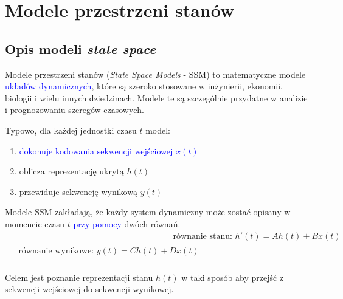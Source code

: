 \documentclass[data-science]{agh-wi} %
\begin{document}

\section{Modele przestrzeni stanów}
\subsection{Opis modeli \textit{state space}}
Modele przestrzeni stanów (\textit{State Space Models} - SSM) to matematyczne modele \textcolor{blue}{układów dynamicznych}, które są szeroko stosowane w inżynierii, ekonomii, biologii i wielu innych dziedzinach. Modele te są szczególnie przydatne w analizie i prognozowaniu szeregów czasowych.

\noindent Typowo, dla każdej jednostki czasu $t$ model:
\begin{enumerate}
    \item \textcolor{blue}{dokonuje kodowania sekwencji wejściowej $x(t)$}
    \item oblicza reprezentację ukrytą $h(t)$
    \item przewiduje sekwencję wynikową $y(t)$
\end{enumerate}

Modele SSM zakładają, że każdy system dynamiczny może zostać opisany w momencie czasu $t$ \textcolor{blue}{przy pomocy} dwóch równań.
\begin{align}
     & \text{równanie stanu: } h'(t) = Ah(t) + Bx(t) \label{equ:rownanie_stanu} \\
    \begin{split}
        &\text{równanie wynikowe: } y(t) = Ch(t) + Dx(t) \label{equ:rownanie_wynikowe} \\
    \end{split}
\end{align}

Celem jest poznanie reprezentacji stanu $h(t)$ w taki sposób aby przejść z sekwencji wejściowej do sekwencji wynikowej.
\end{document}
